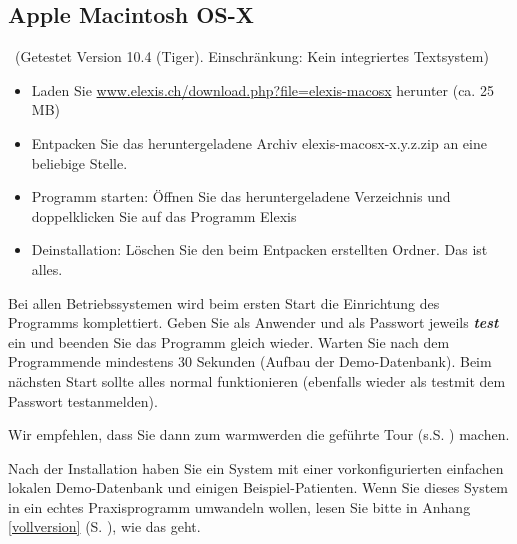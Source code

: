 \subsection{Apple Macintosh OS-X}\
(Getestet Version 10.4 (Tiger). Einschränkung: Kein integriertes Textsystem)
\index{Macintosh}\index{Apple}
\begin{itemize}
	\item Laden Sie \href{http://www.elexis.ch/download.php?file=elexis-macosx}{www.elexis.ch/down\-load.php?file=elexis-macosx} herunter (ca. 25 MB)
	\item Entpacken Sie das heruntergeladene Archiv elexis-macosx-x.y.z.zip an eine beliebige Stelle.
    \item Programm starten: Öffnen Sie das herunter\-geladene Verzeichnis und doppel\-klic\-ken Sie auf das Pro\-gramm \glqq Elexis\grqq{}
	\item Deinstallation: Löschen Sie den beim Entpacken erstellten Ordner. Das ist alles.
\end{itemize}

Bei allen Betriebssystemen wird beim ersten Start die Einrichtung des Programms komplettiert.
Geben Sie als Anwender und als Passwort jeweils \textbf{\textit{test}}\index{Passwort}
ein und beenden Sie das Programm gleich wieder. Warten Sie nach dem Programmende mindestens 30 Sekunden (Aufbau der Demo-Datenbank). Beim nächsten Start sollte alles normal funktionieren (ebenfalls wieder als \glqq test\grqq mit dem Passwort \glqq test\grqq anmelden).

Wir empfehlen, dass Sie dann zum \glqq warmwerden\grqq{} die geführte Tour (s.S.
\pageref{tour}) machen.

\bigskip
Nach der Installation haben Sie ein System mit einer vorkonfigurierten einfachen
lokalen Demo-Datenbank und einigen Beispiel-Patienten. Wenn Sie dieses System in ein
\glqq echtes\grqq{} Praxisprogramm umwandeln wollen, lesen Sie bitte in Anhang
\ref{vollversion} (S. \pageref{vollversion}), wie das geht.
